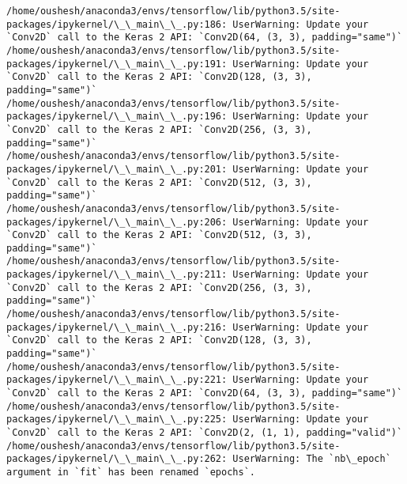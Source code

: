 \documentclass[11pt]{article}
\begin{document}
    \begin{Verbatim}[commandchars=\\\{\}]
/home/oushesh/anaconda3/envs/tensorflow/lib/python3.5/site-packages/ipykernel/\_\_main\_\_.py:186: UserWarning: Update your `Conv2D` call to the Keras 2 API: `Conv2D(64, (3, 3), padding="same")`
/home/oushesh/anaconda3/envs/tensorflow/lib/python3.5/site-packages/ipykernel/\_\_main\_\_.py:191: UserWarning: Update your `Conv2D` call to the Keras 2 API: `Conv2D(128, (3, 3), padding="same")`
/home/oushesh/anaconda3/envs/tensorflow/lib/python3.5/site-packages/ipykernel/\_\_main\_\_.py:196: UserWarning: Update your `Conv2D` call to the Keras 2 API: `Conv2D(256, (3, 3), padding="same")`
/home/oushesh/anaconda3/envs/tensorflow/lib/python3.5/site-packages/ipykernel/\_\_main\_\_.py:201: UserWarning: Update your `Conv2D` call to the Keras 2 API: `Conv2D(512, (3, 3), padding="same")`
/home/oushesh/anaconda3/envs/tensorflow/lib/python3.5/site-packages/ipykernel/\_\_main\_\_.py:206: UserWarning: Update your `Conv2D` call to the Keras 2 API: `Conv2D(512, (3, 3), padding="same")`
/home/oushesh/anaconda3/envs/tensorflow/lib/python3.5/site-packages/ipykernel/\_\_main\_\_.py:211: UserWarning: Update your `Conv2D` call to the Keras 2 API: `Conv2D(256, (3, 3), padding="same")`
/home/oushesh/anaconda3/envs/tensorflow/lib/python3.5/site-packages/ipykernel/\_\_main\_\_.py:216: UserWarning: Update your `Conv2D` call to the Keras 2 API: `Conv2D(128, (3, 3), padding="same")`
/home/oushesh/anaconda3/envs/tensorflow/lib/python3.5/site-packages/ipykernel/\_\_main\_\_.py:221: UserWarning: Update your `Conv2D` call to the Keras 2 API: `Conv2D(64, (3, 3), padding="same")`
/home/oushesh/anaconda3/envs/tensorflow/lib/python3.5/site-packages/ipykernel/\_\_main\_\_.py:225: UserWarning: Update your `Conv2D` call to the Keras 2 API: `Conv2D(2, (1, 1), padding="valid")`
/home/oushesh/anaconda3/envs/tensorflow/lib/python3.5/site-packages/ipykernel/\_\_main\_\_.py:262: UserWarning: The `nb\_epoch` argument in `fit` has been renamed `epochs`.

    \end{Verbatim}
\end{document}
